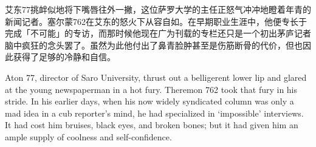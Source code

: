 艾东77挑衅似地将下嘴唇往外一撇，这位萨罗大学的主任正怒气冲冲地瞪着年青的新闻记者。塞尔蒙762在艾东的怒火下从容自如。在早期职业生涯中，他便专长于完成「不可能」的专访，而那时候他现在广为刊载的专栏还只是一个初出茅庐记者脑中疯狂的念头罢了。虽然为此他付出了鼻青脸肿甚至是伤筋断骨的代价，但也因此获得了足够的冷静和自信。

Aton 77, director of Saro University, thrust out a belligerent lower lip and glared at the young newspaperman in a hot fury. Theremon 762 took that fury in his stride. In his earlier days, when his now widely syndicated column was only a mad idea in a cub reporter's mind, he had specialized in `impossible' interviews. It had cost him bruises, black eyes, and broken bones; but it had given him an ample supply of coolness and self-confidence.
